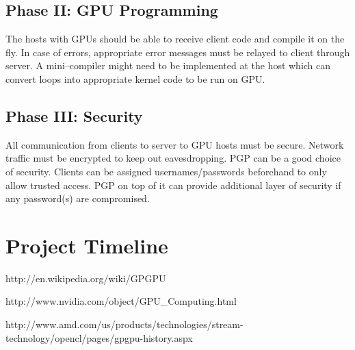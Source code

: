 \documentclass{article}
\begin{document}
\subsection{Phase II: GPU Programming}
The hosts with GPUs should be able to receive client code and compile it on the fly. In case of errors, appropriate error messages must be relayed to client through server. A mini--compiler might need to be implemented at the host which can convert loops into appropriate kernel code to be run on GPU.

\subsection{Phase III: Security}
All communication from clients to server to GPU hosts must be secure. Network traffic must be encrypted to keep out eavesdropping. PGP can be a good choice of security. Clients can be assigned usernames/passwords beforehand to only allow trusted access. PGP on top of it can provide additional layer of security if any password(s) are compromised.

\section{Project Timeline}

\begin{thebibliography}{2}

http://en.wikipedia.org/wiki/GPGPU

http://www.nvidia.com/object/GPU\_Computing.html

http://www.amd.com/us/products/technologies/stream-technology/opencl/pages/gpgpu-history.aspx

\end{thebibliography}
\end{document}
